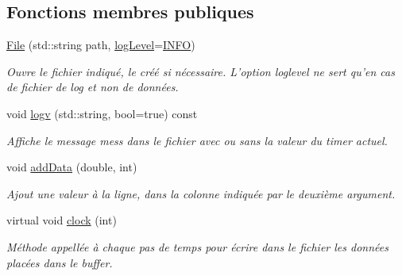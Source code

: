 \subsection*{Fonctions membres publiques}
\begin{DoxyCompactItemize}
\item 
\hypertarget{classFile_a85a14bb04d115aaa8e9b8be4069d98ee}{\hyperlink{classFile_a85a14bb04d115aaa8e9b8be4069d98ee}{File} (std\-::string path, \hyperlink{classHCI_a395f0ab7958108f23c34c7a04b56c4b0}{log\-Level}=\hyperlink{classHCI_a395f0ab7958108f23c34c7a04b56c4b0ab3f339d63b08c4a353f0f6609366d6a2}{I\-N\-F\-O})}\label{classFile_a85a14bb04d115aaa8e9b8be4069d98ee}

\begin{DoxyCompactList}\small\item\em Ouvre le fichier indiqué, le créé si nécessaire. L'option loglevel ne sert qu'en cas de fichier de log et non de données. \end{DoxyCompactList}\item 
\hypertarget{classFile_a72baa06dce43c7cbd82d25d357e4fa39}{void \hyperlink{classFile_a72baa06dce43c7cbd82d25d357e4fa39}{logv} (std\-::string, bool=true) const }\label{classFile_a72baa06dce43c7cbd82d25d357e4fa39}

\begin{DoxyCompactList}\small\item\em Affiche le message mess dans le fichier avec ou sans la valeur du timer actuel. \end{DoxyCompactList}\item 
\hypertarget{classFile_af80e9bf2fc24cd658b1849f0436f116c}{void \hyperlink{classFile_af80e9bf2fc24cd658b1849f0436f116c}{add\-Data} (double, int)}\label{classFile_af80e9bf2fc24cd658b1849f0436f116c}

\begin{DoxyCompactList}\small\item\em Ajout une valeur à la ligne, dans la colonne indiquée par le deuxième argument. \end{DoxyCompactList}\item 
\hypertarget{classFile_a0d228ae6ae9649a792092cf48625ccdf}{virtual void \hyperlink{classFile_a0d228ae6ae9649a792092cf48625ccdf}{clock} (int)}\label{classFile_a0d228ae6ae9649a792092cf48625ccdf}

\begin{DoxyCompactList}\small\item\em Méthode appellée à chaque pas de temps pour écrire dans le fichier les données placées dans le buffer. \end{DoxyCompactList}\end{DoxyCompactItemize}
